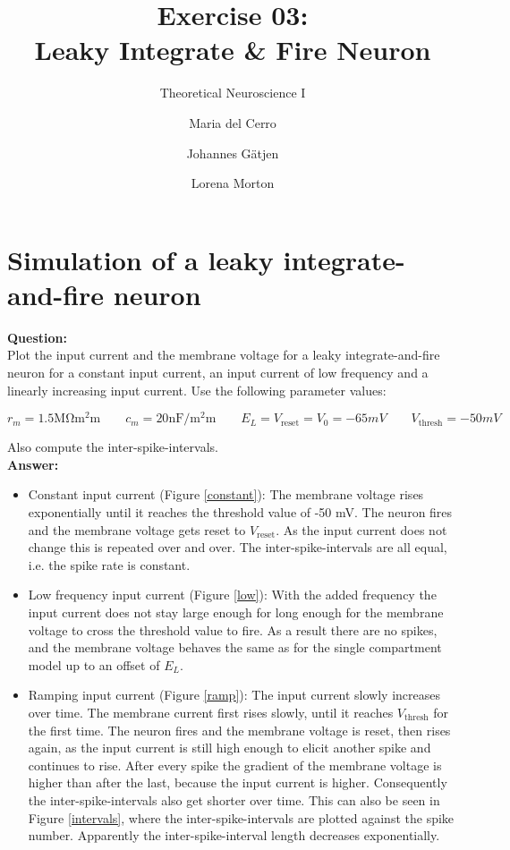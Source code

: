 \documentclass{scrartcl}
\title{Exercise 03:\\Leaky Integrate \& Fire Neuron}
\subtitle{Theoretical Neuroscience I}
\author{Maria del Cerro \and Johannes G\"atjen \and Lorena Morton}
\newcommand\Question{%
  \textbf{Question:}%
}
\newcommand\Answer{%
  \textbf{Answer:}%
}
\begin{document}
\maketitle
\section{Simulation of a leaky integrate-and-fire neuron}

\Question\\
Plot the input current and the membrane voltage for a leaky integrate-and-fire neuron for a constant input current, an input current of low frequency and a linearly increasing input current. Use the following parameter values:

\begin{equation*}
r_m = 1.5 \si{\mega\ohm\square\milli\meter} \qquad c_m = 20 \si{\nano\farad\per\square\milli\meter} \qquad E_L= V_\mathrm{reset}= V_0 = -65 \si{mV} \qquad V_\mathrm{thresh} = -50 \si{mV}
\end{equation*}

Also compute the inter-spike-intervals.
\\

\Answer\\

\begin{itemize}
\item
Constant input current (Figure \ref{constant}): The membrane voltage rises exponentially until it reaches the threshold value of -50 \si{mV}. The neuron fires and the membrane voltage gets reset to $V_\mathrm{reset}$. As the input current does not change this is repeated over and over. The inter-spike-intervals are all equal, i.e. the spike rate is constant.
\item
Low frequency input current (Figure \ref{low}): With the added frequency the input current does not stay large enough for long enough for the membrane voltage to cross the threshold value to fire. As a result there are no spikes, and the membrane voltage behaves the same as for the single compartment model up to an offset of $E_L$.
\item
Ramping input current (Figure \ref{ramp}): The input current slowly increases over time. The membrane current first rises slowly, until it reaches $V_\mathrm{thresh}$ for the first time. The neuron fires and the membrane voltage is reset, then rises again, as the input current is still high enough to elicit another spike and continues to rise. After every spike the gradient of the membrane voltage is higher than after the last, because the input current is higher. Consequently the inter-spike-intervals also get shorter over time. This can also be seen in Figure \ref{intervals}, where the inter-spike-intervals are plotted against the spike number. Apparently the inter-spike-interval length decreases exponentially.
\end{itemize}
\end{document}
